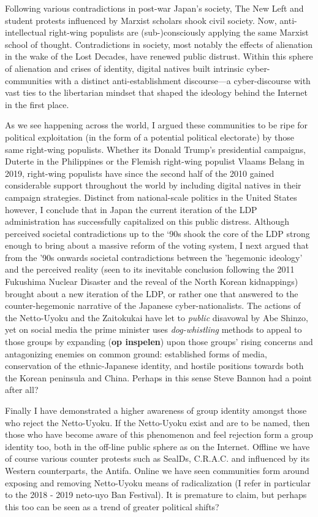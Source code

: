\documentclass[10pt,british,A4paper,,openany]{memoir}
\begin{document}
Following various contradictions in post-war Japan's society, The New
Left and student protests influenced by Marxist scholars shook civil
society. Now, anti-intellectual right-wing populists are
(sub-)consciously applying the same Marxist school of thought.
Contradictions in society, most notably the effects of alienation in the
wake of the Lost Decades, have renewed public distrust. Within this
sphere of alienation and crises of identity, digital natives built
intrinsic cyber-communities with a distinct anti-establishment
discourse---a cyber-discourse with vast ties to the libertarian mindset
that shaped the ideology behind the Internet in the first place.

As we see happening across the world, I argued these communities to be
ripe for political exploitation (in the form of a potential political
electorate) by those same right-wing populists. Whether its Donald
Trump's presidential campaigns, Duterte in the Philippines or the
Flemish right-wing populist Vlaams Belang in 2019, right-wing populists
have since the second half of the 2010 gained considerable support
throughout the world by including digital natives in their campaign
strategies. Distinct from national-scale politics in the United States
however, I conclude that in Japan the current iteration of the LDP
administration has successfully capitalized on this public distress.
Although perceived societal contradictions up to the `90s shook the core
of the LDP strong enough to bring about a massive reform of the voting
system, I next argued that from the '90s onwards societal contradictions
between the 'hegemonic ideology' and the perceived reality (seen to its
inevitable conclusion following the 2011 Fukushima Nuclear Disaster and
the reveal of the North Korean kidnappings) brought about a new
iteration of the LDP, or rather one that answered to the
counter-hegemonic narrative of the Japanese cyber-nationalists. The
actions of the Netto-Uyoku and the Zaitokukai have let to \emph{public}
disavowal by Abe Shinzo, yet on social media the prime minister uses
\emph{dog-whistling} methods to appeal to those groups by expanding
(\textbf{op inspelen}) upon those groups' rising concerns and
antagonizing enemies on common ground: established forms of media,
conservation of the ethnic-Japanese identity, and hostile positions
towards both the Korean peninsula and China. Perhaps in this sense Steve
Bannon had a point after all?

Finally I have demonstrated a higher awareness of group identity amongst
those who reject the Netto-Uyoku. If the Netto-Uyoku exist and are to be
named, then those who have become aware of this phenomenon and feel
rejection form a group identity too, both in the off-line public sphere
as on the Internet. Offline we have of course various counter protests
such as SealDs, C.R.A.C. and influenced by its Western counterparts, the
Antifa. Online we have seen communities form around exposing and
removing Netto-Uyoku means of radicalization (I refer in particular to
the 2018 - 2019 neto-uyo Ban Festival). It is premature to claim, but
perhaps this too can be seen as a trend of greater political shifts?
\end{document}

